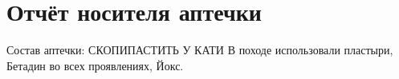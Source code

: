 \section{Отчёт носителя аптечки}

Состав аптечки: \alert{СКОПИПАСТИТЬ У КАТИ}
В походе использовали пластыри, Бетадин во всех проявлениях, Йокс.